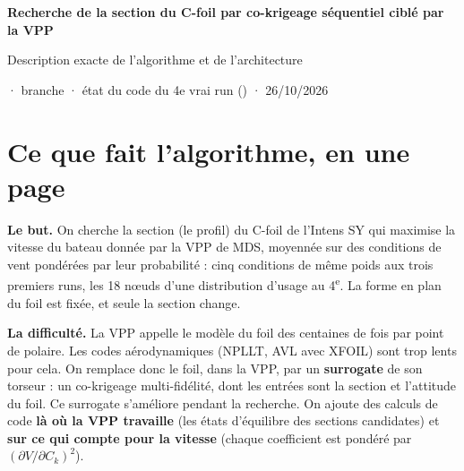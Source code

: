 \documentclass[10pt,a4paper]{article}
\begin{document}
{\centering
{\Large\bfseries\color{blue!40!black} Recherche de la section du C-foil par co-krigeage séquentiel
ciblé par la VPP\par}
\vspace{0.2em}
{\large Description exacte de l'algorithme et de l'architecture\par}
\vspace{0.3em}
{\small {} · branche  · état du
code du 4e vrai run () · 26/10/2026\par}
\vspace{0.2em}}

\tableofcontents

\section{Ce que fait l'algorithme, en une page}
\textbf{Le but.} On cherche la section (le profil) du C-foil de l'Intens SY qui maximise la vitesse du
bateau donnée par la VPP de MDS, moyennée sur des conditions de vent pondérées par leur probabilité : cinq
conditions de même poids aux trois premiers runs, les 18 nœuds d'une distribution d'usage au
4\textsuperscript{e}. La forme en plan du foil est fixée, et seule la section change.

\textbf{La difficulté.} La VPP appelle le modèle du foil des centaines de fois par point de polaire. Les codes
aérodynamiques (NPLLT, AVL avec XFOIL) sont trop lents pour cela. On remplace donc le foil, dans la VPP, par
un \textbf{surrogate} de son torseur : un co-krigeage multi-fidélité, dont les entrées sont la section et
l'attitude du foil. Ce surrogate s'améliore pendant la recherche. On ajoute des calculs de code
\textbf{là où la VPP travaille} (les états d'équilibre des sections candidates) et \textbf{sur ce qui compte
pour la vitesse} (chaque coefficient est pondéré par $(\partial V/\partial C_k)^2$).
\end{document}
